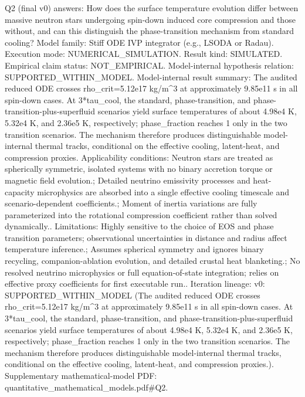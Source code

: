 \documentclass[conference]{IEEEtran}
\begin{document}
Q2 (final v0) answers: How does the surface temperature evolution differ between massive neutron stars undergoing spin-down induced core compression and those without, and can this distinguish the phase-transition mechanism from standard cooling? Model family: Stiff ODE IVP integrator (e.g., LSODA or Radau). Execution mode: NUMERICAL\_SIMULATION. Result kind: SIMULATED. Empirical claim status: NOT\_EMPIRICAL. Model-internal hypothesis relation: SUPPORTED\_WITHIN\_MODEL. Model-internal result summary: The audited reduced ODE crosses rho\_crit=5.12e17 kg/m\textasciicircum{}3 at approximately 9.85e11 s in all spin-down cases. At 3*tau\_cool, the standard, phase-transition, and phase-transition-plus-superfluid scenarios yield surface temperatures of about 4.98e4 K, 5.32e4 K, and 2.36e5 K, respectively; phase\_fraction reaches 1 only in the two transition scenarios. The mechanism therefore produces distinguishable model-internal thermal tracks, conditional on the effective cooling, latent-heat, and compression proxies. Applicability conditions: Neutron stars are treated as spherically symmetric, isolated systems with no binary accretion torque or magnetic field evolution.; Detailed neutrino emissivity processes and heat-capacity microphysics are absorbed into a single effective cooling timescale and scenario-dependent coefficients.; Moment of inertia variations are fully parameterized into the rotational compression coefficient rather than solved dynamically.. Limitations: Highly sensitive to the choice of EOS and phase transition parameters; observational uncertainties in distance and radius affect temperature inference.; Assumes spherical symmetry and ignores binary recycling, companion-ablation evolution, and detailed crustal heat blanketing.; No resolved neutrino microphysics or full equation-of-state integration; relies on effective proxy coefficients for first executable run.. Iteration lineage: v0: SUPPORTED\_WITHIN\_MODEL (The audited reduced ODE crosses rho\_crit=5.12e17 kg/m\textasciicircum{}3 at approximately 9.85e11 s in all spin-down cases. At 3*tau\_cool, the standard, phase-transition, and phase-transition-plus-superfluid scenarios yield surface temperatures of about 4.98e4 K, 5.32e4 K, and 2.36e5 K, respectively; phase\_fraction reaches 1 only in the two transition scenarios. The mechanism therefore produces distinguishable model-internal thermal tracks, conditional on the effective cooling, latent-heat, and compression proxies.). Supplementary mathematical-model PDF: quantitative\_mathematical\_models.pdf\#Q2.
\end{document}
